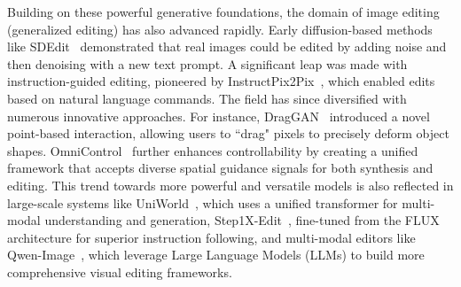 \documentclass{article} %
\begin{document}
Building on these powerful generative foundations, the domain of image editing (generalized editing) has also advanced rapidly. Early diffusion-based methods like SDEdit~\citep{meng2021sdedit} demonstrated that real images could be edited by adding noise and then denoising with a new text prompt. A significant leap was made with instruction-guided editing, pioneered by InstructPix2Pix~\citep{instructpix2pix}, which enabled edits based on natural language commands. The field has since diversified with numerous innovative approaches. For instance, DragGAN~\citep{pan2023draggan} introduced a novel point-based interaction, allowing users to ``drag" pixels to precisely deform object shapes. OmniControl~\citep{omnicontrol} further enhances controllability by creating a unified framework that accepts diverse spatial guidance signals for both synthesis and editing. This trend towards more powerful and versatile models is also reflected in large-scale systems like UniWorld~\citep{uniworld}, which uses a unified transformer for multi-modal understanding and generation, Step1X-Edit~\citep{step}, fine-tuned from the FLUX architecture for superior instruction following, and multi-modal editors like Qwen-Image~\citep{qwenimage}, which leverage Large Language Models (LLMs) to build more comprehensive visual editing frameworks.
\end{document}
